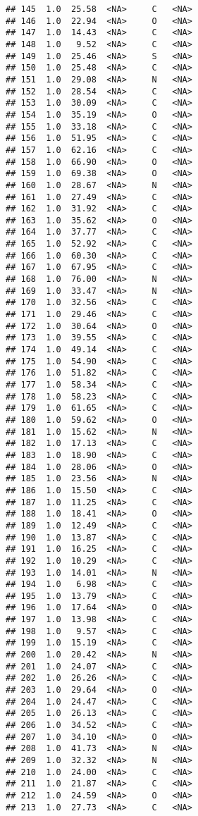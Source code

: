 \documentclass[
]{article}
\begin{document}
\begin{verbatim}
## 145  1.0  25.58  <NA>     C   <NA>
## 146  1.0  22.94  <NA>     O   <NA>
## 147  1.0  14.43  <NA>     C   <NA>
## 148  1.0   9.52  <NA>     C   <NA>
## 149  1.0  25.46  <NA>     S   <NA>
## 150  1.0  25.48  <NA>     C   <NA>
## 151  1.0  29.08  <NA>     N   <NA>
## 152  1.0  28.54  <NA>     C   <NA>
## 153  1.0  30.09  <NA>     C   <NA>
## 154  1.0  35.19  <NA>     O   <NA>
## 155  1.0  33.18  <NA>     C   <NA>
## 156  1.0  51.95  <NA>     C   <NA>
## 157  1.0  62.16  <NA>     C   <NA>
## 158  1.0  66.90  <NA>     O   <NA>
## 159  1.0  69.38  <NA>     O   <NA>
## 160  1.0  28.67  <NA>     N   <NA>
## 161  1.0  27.49  <NA>     C   <NA>
## 162  1.0  31.92  <NA>     C   <NA>
## 163  1.0  35.62  <NA>     O   <NA>
## 164  1.0  37.77  <NA>     C   <NA>
## 165  1.0  52.92  <NA>     C   <NA>
## 166  1.0  60.30  <NA>     C   <NA>
## 167  1.0  67.95  <NA>     C   <NA>
## 168  1.0  76.00  <NA>     N   <NA>
## 169  1.0  33.47  <NA>     N   <NA>
## 170  1.0  32.56  <NA>     C   <NA>
## 171  1.0  29.46  <NA>     C   <NA>
## 172  1.0  30.64  <NA>     O   <NA>
## 173  1.0  39.55  <NA>     C   <NA>
## 174  1.0  49.14  <NA>     C   <NA>
## 175  1.0  54.90  <NA>     C   <NA>
## 176  1.0  51.82  <NA>     C   <NA>
## 177  1.0  58.34  <NA>     C   <NA>
## 178  1.0  58.23  <NA>     C   <NA>
## 179  1.0  61.65  <NA>     C   <NA>
## 180  1.0  59.62  <NA>     O   <NA>
## 181  1.0  15.62  <NA>     N   <NA>
## 182  1.0  17.13  <NA>     C   <NA>
## 183  1.0  18.90  <NA>     C   <NA>
## 184  1.0  28.06  <NA>     O   <NA>
## 185  1.0  23.56  <NA>     N   <NA>
## 186  1.0  15.50  <NA>     C   <NA>
## 187  1.0  11.25  <NA>     C   <NA>
## 188  1.0  18.41  <NA>     O   <NA>
## 189  1.0  12.49  <NA>     C   <NA>
## 190  1.0  13.87  <NA>     C   <NA>
## 191  1.0  16.25  <NA>     C   <NA>
## 192  1.0  10.29  <NA>     C   <NA>
## 193  1.0  14.01  <NA>     N   <NA>
## 194  1.0   6.98  <NA>     C   <NA>
## 195  1.0  13.79  <NA>     C   <NA>
## 196  1.0  17.64  <NA>     O   <NA>
## 197  1.0  13.98  <NA>     C   <NA>
## 198  1.0   9.57  <NA>     C   <NA>
## 199  1.0  15.19  <NA>     C   <NA>
## 200  1.0  20.42  <NA>     N   <NA>
## 201  1.0  24.07  <NA>     C   <NA>
## 202  1.0  26.26  <NA>     C   <NA>
## 203  1.0  29.64  <NA>     O   <NA>
## 204  1.0  24.47  <NA>     C   <NA>
## 205  1.0  26.13  <NA>     C   <NA>
## 206  1.0  34.52  <NA>     C   <NA>
## 207  1.0  34.10  <NA>     O   <NA>
## 208  1.0  41.73  <NA>     N   <NA>
## 209  1.0  32.32  <NA>     N   <NA>
## 210  1.0  24.00  <NA>     C   <NA>
## 211  1.0  21.87  <NA>     C   <NA>
## 212  1.0  24.59  <NA>     O   <NA>
## 213  1.0  27.73  <NA>     C   <NA>

\end{verbatim}
\end{document}
